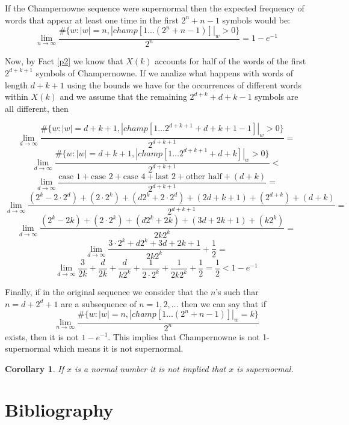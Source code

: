 \documentclass[11pt,a4paper,twoside]{tesis}
\newtheorem{corollary}{Corollary}[theorem]
\theoremstyle{definition}
\begin{document}
If the Champernowne sequence were supernormal then the expected frequency of words that appear at least one time in the first $2^n + n -1$ symbols would be:
$$\lim_{n\to\infty} \frac{\#\{w: |w| = n  , |champ[1...(2^n+n-1)]|_w > 0\}}{2^n}  = 1 - e^{-1}$$


Now, by Fact \ref{p2} we know that $X(k)$ accounts for half of the words of the first $2^{d+k+1}$ symbols of Champernowne. 
If we analize what happens with words of length $d+k+1$ using the bounds we have for the occurrences of different words within $X(k)$ and we assume that the remaining $2^{d+k} + d + k - 1$  symbols are all different, then



$$\lim_{d\to\infty} \frac{\#\{w : |w| = d+k+1, |champ[1 \dots 2^{d+k+1}+d+k+1-1]|_w > 0 \}}{2^{d+k+1}} =$$
$$\lim_{d\to\infty} \frac{\#\{w : |w| = d+k+1, |champ[1 \dots 2^{d+k+1}+d+k]|_w > 0 \}}{2^{d+k+1}} <$$
$$\lim_{d\to\infty} \frac{ \textrm{case 1} + \textrm{case 2}+ \textrm{case 4} + \textrm{last 2} + \textrm{other half} + (d + k) }{2^{d+k+1}} =$$
$$\lim_{d\to\infty} \frac{(2^k - 2\cdot 2^d) + (2 \cdot 2^k)+ (d2^k + 2 \cdot 2^d) + (2d+k+1) + (2^{d+k}) + (d + k) }{2^{d+k+1}} =$$
$$\lim_{d\to\infty} \frac{(2^k - 2k) + (2 \cdot 2^k)+ (d2^k + 2k) + (3d+2k+1) + (k2^{k})}{2k2^{k}} =$$
$$\lim_{d\to\infty} \frac{3\cdot2^k + d2^k  + 3d+2k+1}{2k2^{k}} + \frac{1}{2} =$$
$$\lim_{d\to\infty} \frac{3}{2k} + \frac{d}{2k} + \frac{d}{k2^{k}} + \frac{1}{2\cdot2^{k}} + \frac{1}{2k2^{k}} + \frac{1}{2} = \frac{1}{2} < 1 - e^{-1}$$


Finally, if in the original sequence we consider that the $n$'s such thar $n = d + 2^d + 1$ are a subsequence of $n=1,2,\dots$ then we can say that if
$$\lim_{n\to\infty} \frac{\#\{w: |w| = n  , |champ[1...(2^n+n-1)]|_w = k\}}{2^n}$$
exists, then it is not $1 - e^{-1}$.
This implies that Champernowne is not 1-supernormal which means it is not supernormal.

\begin{corollary}
If $x$ is a normal number it is not implied that $x$ is supernormal.
\end{corollary}



\chapter{Bibliography}
\backmatter


\end{document}
